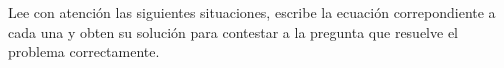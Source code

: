 \question Lee con atención las siguientes situaciones, escribe la ecuación correpondiente a cada una y obten su solución para contestar a la pregunta que resuelve el problema correctamente.
\begin{multicols}{2}
    \begin{parts}
        {\printanswers
            
            
        }
        \newpage
        
        
        \newpage
        
        
    \end{parts}
\end{multicols}
